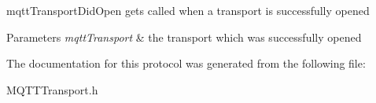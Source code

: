 mqtt\+Transport\+Did\+Open gets called when a transport is successfully opened 
\begin{DoxyParams}{Parameters}
{\em mqtt\+Transport} & the transport which was successfully opened \\
\hline
\end{DoxyParams}


The documentation for this protocol was generated from the following file\+:\begin{DoxyCompactItemize}
\item 
M\+Q\+T\+T\+Transport.\+h\end{DoxyCompactItemize}
